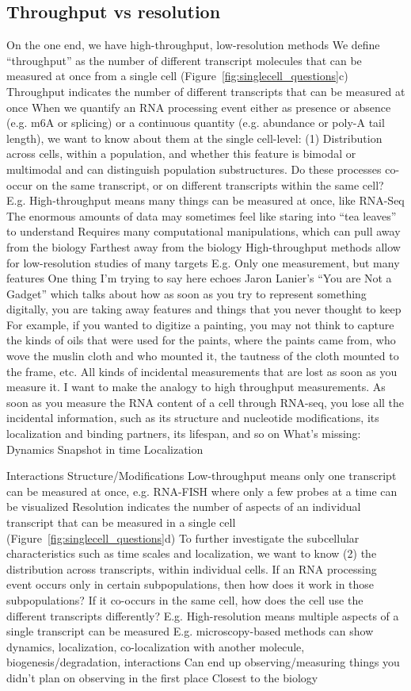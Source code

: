 \subsection{Throughput vs resolution}
On the one end, we have high-throughput, low-resolution methods
We define ``throughput'' as the number of different transcript molecules that can be measured at once from a single cell (Figure~\ref{fig:singlecell_questions}c)
Throughput indicates the number of different transcripts that can be measured at once
When we quantify an RNA processing event either as presence or absence (e.g. m6A or splicing) or a continuous quantity (e.g. abundance or poly-A tail length), we want to know about them at the single cell-level: (1) Distribution across cells, within a population, and whether this feature is bimodal or multimodal and can distinguish population substructures. Do these processes co-occur on the same transcript, or on different transcripts within the same cell?
E.g. High-throughput means many things can be measured at once, like RNA-Seq
The enormous amounts of data may sometimes feel like staring into ``tea leaves'' to understand
Requires many computational manipulations, which can pull away from the biology
Farthest away from the biology
High-throughput methods allow for low-resolution studies of many targets
E.g. Only one measurement, but many features
One thing I'm trying to say here echoes Jaron Lanier's ``You are Not a Gadget'' which talks about how as soon as you try to represent something digitally, you are taking away features and things that you never thought to keep
For example, if you wanted to digitize a painting, you may not think to capture the kinds of oils that were used for the paints, where the paints came from, who wove the muslin cloth and who mounted it, the tautness of the cloth mounted to the frame, etc. All kinds of incidental measurements that are lost as soon as you measure it.
I want to make the analogy to high throughput measurements.
As soon as you measure the RNA content of a cell through RNA-seq, you lose all the incidental information, such as its structure and nucleotide modifications, its localization and binding partners, its lifespan, and so on
What's missing:
Dynamics
Snapshot in time
Localization

Interactions
Structure/Modifications
Low-throughput means only one transcript can be measured at once, e.g. RNA-FISH where only a few probes at a time can be visualized
Resolution indicates the number of aspects of an individual transcript that can be measured in a single cell (Figure~\ref{fig:singlecell_questions}d)
To further investigate the subcellular characteristics such as time scales and localization, we want to know (2) the distribution across transcripts, within individual cells. If an RNA processing event occurs only in certain subpopulations, then how does it work in those subpopulations? If it co-occurs in the same cell, how does the cell use the different transcripts differently?
E.g. High-resolution means multiple aspects of a single transcript can be measured
E.g. microscopy-based methods can show dynamics, localization, co-localization with another molecule, biogenesis/degradation, interactions
Can end up observing/measuring things you didn't plan on observing in the first place
Closest to the biology


